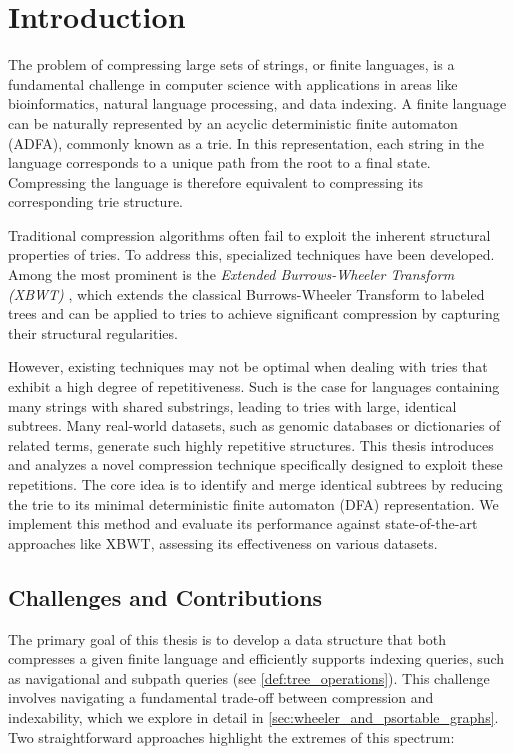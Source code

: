 \chapter{Introduction} \label{chp:introduction}
The problem of compressing large sets of strings, or finite languages, is a fundamental challenge in computer science with applications in areas like bioinformatics, natural language processing, and data indexing. A finite language can be naturally represented by an acyclic deterministic finite automaton (ADFA), commonly known as a trie. In this representation, each string in the language corresponds to a unique path from the root to a final state. Compressing the language is therefore equivalent to compressing its corresponding trie structure.

Traditional compression algorithms often fail to exploit the inherent structural properties of tries. To address this, specialized techniques have been developed. Among the most prominent is the \textit{Extended Burrows-Wheeler Transform (XBWT)} \cite{ferragina2009compressing}, which extends the classical Burrows-Wheeler Transform \cite{burrows1994block} to labeled trees and can be applied to tries to achieve significant compression by capturing their structural regularities.

However, existing techniques may not be optimal when dealing with tries that exhibit a high degree of repetitiveness. Such is the case for languages containing many strings with shared substrings, leading to tries with large, identical subtrees. Many real-world datasets, such as genomic databases or dictionaries of related terms, generate such highly repetitive structures. This thesis introduces and analyzes a novel compression technique specifically designed to exploit these repetitions. The core idea is to identify and merge identical subtrees by reducing the trie to its minimal deterministic finite automaton (DFA) representation. We implement this method and evaluate its performance against state-of-the-art approaches like XBWT, assessing its effectiveness on various datasets.

\section{Challenges and Contributions}
The primary goal of this thesis is to develop a data structure that both compresses a given finite language and efficiently supports indexing queries, such as navigational and subpath queries (see \cref{def:tree_operations}). This challenge involves navigating a fundamental trade-off between compression and indexability, which we explore in detail in \cref{sec:wheeler_and_psortable_graphs}. Two straightforward approaches highlight the extremes of this spectrum:

